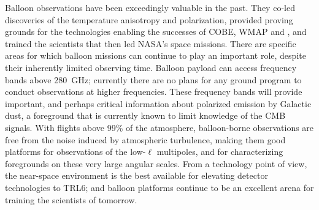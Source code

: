 \documentclass[PICOReport.tex]{subfiles}
\begin{document}

Balloon observations have been exceedingly valuable in the past. They co-led discoveries of the temperature anisotropy and polarization, provided proving grounds for the technologies enabling the successes of COBE, WMAP and \planck , and trained the scientists that then led NASA's space missions. There are specific areas for which balloon missions can continue to play an important role, despite their inherently limited observing time. Balloon payload can access frequency bands above 280~GHz; currently there are no plans for any ground program to conduct observations at higher frequencies. These frequency bands will provide important, and perhaps critical information about polarized emission by  Galactic dust, a foreground that is currently known to limit knowledge of the CMB signals.  With flights above 99\% of the atmosphere, balloon-borne observations are free from the noise induced by atmospheric turbulence, making them good platforms for observations of the low-$\ell$ multipoles, and for characterizing foregrounds on these very large angular scales. From a technology point of view, the near-space environment is the best available for elevating detector technologies to TRL6; and balloon platforms continue to be an excellent arena for training the scientists of tomorrow. 

\end{document}
